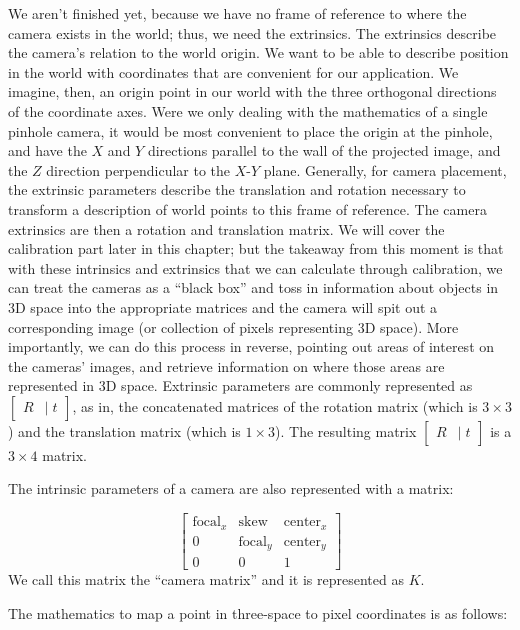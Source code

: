 \documentclass[
    12pt,
    twoside,
    bibstyle=chicago,
    headerstyle=uppercase,
	bibfile=biblatex_updating.bib
]{reedthesis}
\newcommand{\rt}{\left[\begin{smallmatrix}R &|\; t\end{smallmatrix}\right]}
\begin{document}
We aren't finished yet, because we have no frame of reference to where the camera exists in the world; thus, we need the extrinsics. The extrinsics describe the camera's relation to the world origin. We want to be able to describe position in the world with coordinates that are convenient for our application. We imagine, then, an origin point in our world with the three orthogonal directions of the coordinate axes. Were we only dealing with the mathematics of a single pinhole camera, it would be most convenient to place the origin at the pinhole, and have the $X$ and $Y$ directions parallel to the wall of the projected image, and the $Z$ direction perpendicular to the $X$-$Y$ plane. Generally, for camera placement, the extrinsic parameters describe the translation and rotation necessary to transform a description of world points to this frame of reference. %
The camera extrinsics are then a rotation and translation matrix. We will cover the calibration part later in this chapter; but the takeaway from this moment is that with these intrinsics and extrinsics that we can calculate through calibration, we can treat the cameras as a “black box” and toss in information about objects in 3D space into the appropriate matrices and the camera will spit out a corresponding image (or collection of pixels representing 3D space). More importantly, we can do this process in reverse, pointing out areas of interest on the cameras' images, and retrieve information on where those areas are represented in 3D space. Extrinsic parameters are commonly represented as $\rt$, as in, the concatenated matrices of the rotation matrix (which is $3\times3$) and the translation matrix (which is $1\times3$). The resulting matrix $\rt$ is a $3\times4$ matrix.

The intrinsic parameters of a camera are also represented with a matrix:

\[\begin{bmatrix}
\text{focal}_x & \text{skew} & \text{center}_x \\
0 & \text{focal}_y & \text{center}_y \\
0 & 0 & 1
\end{bmatrix}\] We call this matrix the “camera matrix” and it is represented as $K$.

The mathematics to map a point in three-space to pixel coordinates is as follows:
\end{document}
